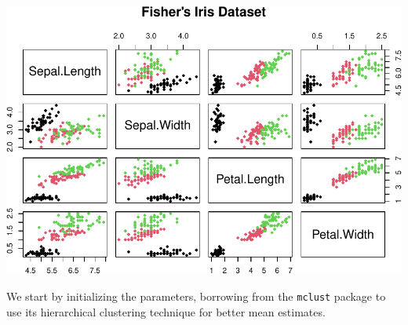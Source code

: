 \documentclass[12pt]{article}
\begin{document}
\includegraphics{CassieJinPaper_files/figure-latex/unnamed-chunk-5-1.pdf}

We start by initializing the parameters, borrowing from the
\texttt{mclust} package to use its hierarchical clustering technique for
better mean estimates.
\end{document}
